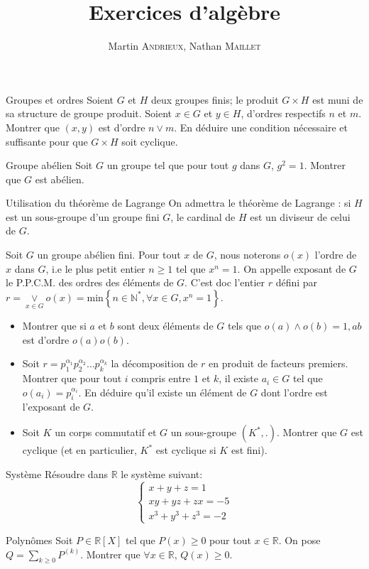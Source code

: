 \documentclass[french, a4paper, 11pt]{article}
\title{Exercices d'algèbre}
\author{Martin \textsc{Andrieux}, Nathan \textsc{Maillet}}
\date{}
\newcommand{\N}{\mathbb{N}}   %
\newcommand{\R}{\mathbb{R}}   %
\newcommand{\co}{\left[}         %
\newcommand{\cf}{\right]}        %
\newcommand{\cof}[1]{\co #1 \cf} %
\begin{document}
\maketitle

\begin{cadre}{Groupes et ordres}
  Soient \(G\) et \(H\) deux groupes finis; le produit \(G\times H\) est muni de sa structure de groupe produit.
  Soient \(x\in G\) et \(y\in H\), d'ordres respectifs \(n\) et \(m\). Montrer que \((x,y)\) est d'ordre \(n\vee m\).
  En déduire une condition nécessaire et suffisante pour que \(G\times H\) soit cyclique.
\end{cadre}

\begin{cadre}{Groupe abélien}
  Soit \(G\) un groupe tel que pour tout \(g\) dans \(G\), \(g^{2} = 1\). Montrer que \(G\) est abélien.
\end{cadre}

\begin{cadre}{Utilisation du théorème de Lagrange}
    On admettra le théorème de Lagrange : si $H$ est un sous-groupe d'un groupe fini $G$, le cardinal de $H$ est un diviseur
    de celui de $G$.
    
    
    Soit $G$ un groupe abélien fini. Pour tout $x$ de $G$, nous noterons $o(x)$ l'ordre de $x$ dans $G$, i.e le plus petit
    entier $n \geq 1$ tel que $x^n=1$. On appelle exposant de $G$ le P.P.C.M. des ordres des éléments de $G$. C'est doc
    l'entier $r$ défini par \(r=\underset{x \in G}{\vee} o(x)=\text{min}\left\{n \in \N^*, \forall x \in G, x^n=1\right\}\).
    \begin{itemize}[label=$\bullet$]
        \item Montrer que si $a$ et $b$ sont deux éléments de $G$ tels que \(o(a) \wedge o(b)=1, ab\) est d'ordre \(o(a)o(b)\).
        \item Soit \(r=p_1^{\alpha_1}p_2^{\alpha_2} \ldots p_k^{\alpha_k}\) la décomposition de $r$ en produit de facteurs premiers.
        Montrer que pour tout $i$ compris entre $1$ et $k$, il existe $a_i \in G$ tel que \(o(a_i)=p_i^{\alpha_i}\).
        En déduire qu'il existe un élément de $G$ dont l'ordre est l'exposant de $G$.    
        \item Soit $K$ un corps commutatif et $G$ un sous-groupe \((K^*,.)\). Montrer que $G$ est cyclique
        (et en particulier, $K^*$ est cyclique si $K$ est fini). 
    \end{itemize}   
\end{cadre}

\begin{cadre}{Système}
  Résoudre dans \(\R\) le système suivant:
  \[\begin{cases}
      x+y+z = 1\\
      xy + yz + zx = -5\\
      x^{3}+y^{3}+z^{3} = -2
  \end{cases}\]
\end{cadre}

\begin{cadre}{Polynômes}
  Soit \(P\in\R\cof{X}\) tel que \(P(x)\geqslant 0\) pour tout \(x\in\R\). On pose \(Q = \sum_{k\geqslant 0}P^{(k)}\).
  Montrer que \(\forall x \in\R,\,Q(x)\geqslant 0\).
\end{cadre}
\end{document}

